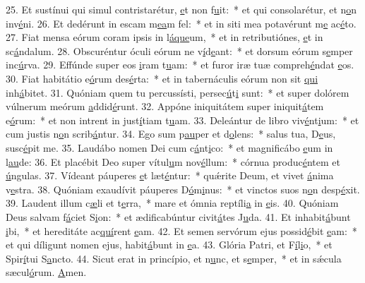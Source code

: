 25. Et sustínui qui simul contristarétur, \uline{e}t non f\uline{u}it:~* et qui consolarétur, et n\uline{o}n inv\uline{é}ni.
26. Et dedérunt in escam m\uline{e}\uline{a}m fel:~* et in siti mea potavérunt m\uline{e} ac\uline{é}to.
27. Fiat mensa eórum coram ipsis in l\uline{á}\uline{que}um,~* et in retributiónes, \uline{e}t in sc\uline{á}ndalum.
28. Obscuréntur óculi eórum ne v\uline{í}d\uline{e}ant:~* et dorsum eórum s\uline{e}mper inc\uline{ú}rva.
29. Effúnde super eos \uline{i}ram t\uline{u}am:~* et furor iræ tuæ compreh\uline{é}ndat \uline{e}os.
30. Fiat habitátio e\uline{ó}rum des\uline{é}rta:~* et in tabernáculis eórum non sit \uline{qui} inh\uline{á}bitet.
31. Quóniam quem tu percussísti, persec\uline{ú}t\uline{i} sunt:~* et super dolórem vúlnerum meórum \uline{a}ddid\uline{é}runt.
32. Appóne iniquitátem super iniquit\uline{á}tem e\uline{ó}rum:~* et non intrent in just\uline{í}tiam t\uline{u}am.
33. Deleántur de libro viv\uline{é}nt\uline{i}um:~* et cum justis n\uline{o}n scrib\uline{á}ntur.
34. Ego sum p\uline{au}per et d\uline{o}lens:~* salus tua, D\uline{e}us, susc\uline{é}pit me.
35. Laudábo nomen Dei cum c\uline{á}nt\uline{i}co:~* et magnificábo \uline{e}um in l\uline{au}de:
36. Et placébit Deo super vítul\uline{u}m nov\uline{é}llum:~* córnua produc\uline{é}ntem et \uline{ú}ngulas.
37. Vídeant páuperes \uline{e}t læt\uline{é}ntur:~* quǽrite Deum, et vivet \uline{á}nima v\uline{e}stra.
38. Quóniam exaudívit páuperes D\uline{ó}m\uline{i}nus:~* et vinctos suos n\uline{o}n desp\uline{é}xit.
39. Laudent illum c\uline{æ}li et t\uline{e}rra,~* mare et ómnia reptíli\uline{a} in \uline{e}is.
40. Quóniam Deus salvam f\uline{á}ciet S\uline{i}on:~* et ædificabúntur civit\uline{á}tes J\uline{u}da.
41. Et inhabit\uline{á}bunt \uline{i}bi,~* et hereditáte ac\uline{quí}rent \uline{e}am.
42. Et semen servórum ejus possid\uline{é}bit \uline{e}am:~* et qui díligunt nomen ejus, habit\uline{á}bunt in \uline{e}a.
43. Glória Patri, et F\uline{í}l\uline{i}o,~* et Spir\uline{í}tui S\uline{a}ncto.
44. Sicut erat in princípio, et n\uline{u}nc, et s\uline{e}mper,~* et in sǽcula sæcul\uline{ó}rum. \uline{A}men.
